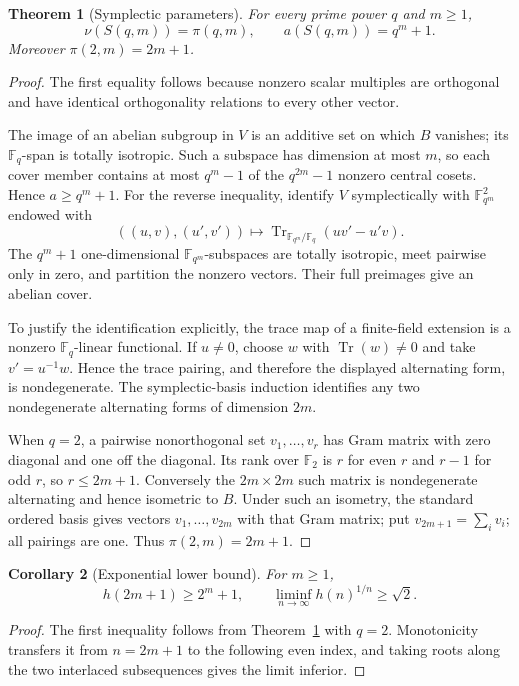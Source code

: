 \documentclass[11pt]{article}
\newtheorem{theorem}{Theorem}[section]
\newtheorem{corollary}[theorem]{Corollary}
\theoremstyle{remark}
\newcommand{\nuG}{\nu}
\newcommand{\aG}{a}
\newcommand{\F}{\mathbb F}
\newcommand{\Tr}{\operatorname{Tr}}
\begin{document}
\begin{theorem}[Symplectic parameters]\label{thm:symplectic}
For every prime power $q$ and $m\ge1$,
\[
 \nuG(S(q,m))=\pi(q,m),\qquad \aG(S(q,m))=q^m+1.
\]
Moreover $\pi(2,m)=2m+1$.
\end{theorem}

\begin{proof}
The first equality follows because nonzero scalar multiples are orthogonal
and have identical orthogonality relations to every other vector.

The image of an abelian subgroup in $V$ is an additive set on which $B$
vanishes; its $\F_q$-span is totally isotropic.  Such a subspace has
dimension at most $m$, so each cover member contains at most $q^m-1$ of the
$q^{2m}-1$ nonzero central cosets.  Hence $\aG\ge q^m+1$.  For the reverse
inequality, identify $V$ symplectically with $\F_{q^m}^2$ endowed with
\[
 ((u,v),(u',v'))\longmapsto\Tr_{\F_{q^m}/\F_q}(uv'-u'v).
\]
The $q^m+1$ one-dimensional $\F_{q^m}$-subspaces are totally isotropic,
meet pairwise only in zero, and partition the nonzero vectors.  Their full
preimages give an abelian cover.

To justify the identification explicitly, the trace map of a finite-field
extension is a nonzero $\F_q$-linear functional. If $u\ne0$, choose $w$ with
$\Tr(w)\ne0$ and take $v'=u^{-1}w$. Hence the trace pairing, and therefore
the displayed alternating form, is nondegenerate. The symplectic-basis
induction identifies any two nondegenerate alternating forms of dimension
$2m$.

When $q=2$, a pairwise nonorthogonal set $v_1,\dots,v_r$ has Gram matrix
with zero diagonal and one off the diagonal.  Its rank over $\F_2$ is $r$
for even $r$ and $r-1$ for odd $r$, so $r\le2m+1$.  Conversely the
$2m\times2m$ such matrix is nondegenerate alternating and hence isometric
to $B$. Under such an isometry, the standard ordered basis gives vectors
$v_1,\dots,v_{2m}$ with that Gram matrix; put
$v_{2m+1}=\sum_i v_i$; all pairings are one.  Thus $\pi(2,m)=2m+1$.
\end{proof}

\begin{corollary}[Exponential lower bound]\label{cor:lower}
For $m\ge1$,
\[
 h(2m+1)\ge2^m+1,\qquad
 \liminf_{n\to\infty}h(n)^{1/n}\ge\sqrt2.
\]
\end{corollary}

\begin{proof}
The first inequality follows from Theorem~\ref{thm:symplectic} with $q=2$.
Monotonicity transfers it from $n=2m+1$ to the following even index, and
taking roots along the two interlaced subsequences gives the limit inferior.
\end{proof}
\end{document}
